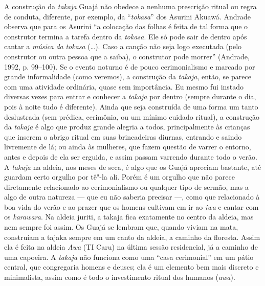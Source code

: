 A construção da \emph{takaja} Guajá não obedece a nenhuma prescrição
ritual ou regra de conduta, diferente, por exemplo, da ``\emph{tokasa}''
dos Asurini Akuawá. Andrade observa que para os Asurini ``a colocação das
folhas é feita de tal forma que o construtor termina a tarefa dentro da
\emph{tokasa}. Ele só pode sair de dentro após cantar a \emph{música}
\emph{da} \emph{tokasa} (\ldots{}). Caso a canção não seja logo executada
(pelo construtor ou outra pessoa que a saiba), o construtor pode morrer''
(Andrade, 1992, p. 99--100). Se o evento noturno é de pouco
cerimonialismo e marcado por grande informalidade (como veremos), a
construção da \emph{takaja}, então, se parece com uma atividade
ordinária, quase sem importância. Eu mesmo fui instado diversas vezes
para entrar e conhecer a \emph{takaja} por dentro (sempre durante o dia,
pois à noite tudo é diferente). Ainda que seja construída de uma forma
um tanto deslustrada (sem prédica, cerimônia, ou um mínimo cuidado
ritual), a construção da \emph{takaja} é algo que produz grande alegria
a todos, principalmente às crianças que inserem o abrigo ritual em suas
brincadeiras diurnas, entrando e saindo livremente de lá; ou ainda às
mulheres, que fazem questão de varrer o entorno, antes e depois de ela
ser erguida, e assim passam varrendo durante todo o verão. A
\emph{takaja} na aldeia, nos meses de seca, é algo que os Guajá apreciam
bastante, até guardam certo orgulho por tê"-la ali. Porém é um orgulho
que não parece diretamente relacionado ao cerimonialismo ou qualquer
tipo de sermão, mas a algo de outra natureza --- que eu não saberia
precisar ---, como que relacionado à boa vida do verão e ao prazer que os
homens cultivam em ir ao \emph{iwa} e cantar com os \emph{karawara}. Na
aldeia juriti, a takaja fica exatamente no centro da aldeia, mas nem
sempre foi assim. Os Guajá se lembram que, quando viviam na mata,
construíam a tajaka sempre em um canto da aldeia, a caminho da floresta.
Assim ela é feita na aldeia \emph{Awa} (TI Caru) na última sessão
residencial, já a caminho de uma capoeira. A \emph{takaja} não funciona
como uma ``casa cerimonial'' em um pátio central, que congregaria homens
e deuses; ela é um elemento bem mais discreto e minimalista, assim como
é todo o investimento ritual dos humanos (\emph{awa}).

